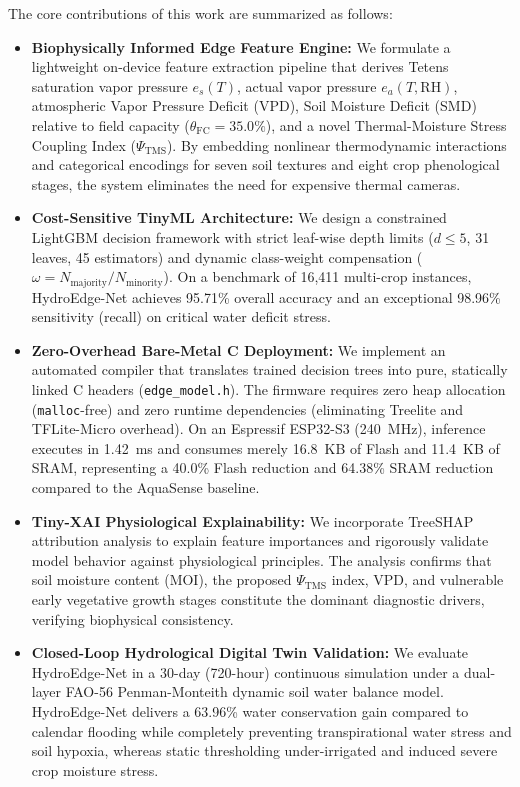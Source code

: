 The core contributions of this work are summarized as follows:
\begin{itemize}
    \item \textbf{Biophysically Informed Edge Feature Engine:} We formulate a lightweight on-device feature extraction pipeline that derives Tetens saturation vapor pressure $e_s(T)$, actual vapor pressure $e_a(T, \text{RH})$, atmospheric Vapor Pressure Deficit (VPD), Soil Moisture Deficit (SMD) relative to field capacity ($\theta_{\text{FC}} = 35.0\%$), and a novel Thermal-Moisture Stress Coupling Index ($\Psi_{\text{TMS}}$). By embedding nonlinear thermodynamic interactions and categorical encodings for seven soil textures and eight crop phenological stages, the system eliminates the need for expensive thermal cameras.
    \item \textbf{Cost-Sensitive TinyML Architecture:} We design a constrained LightGBM decision framework with strict leaf-wise depth limits ($d \le 5$, 31 leaves, 45 estimators) and dynamic class-weight compensation ($\omega = N_{\text{majority}} / N_{\text{minority}}$). On a benchmark of 16,411 multi-crop instances, HydroEdge-Net achieves 95.71\% overall accuracy and an exceptional 98.96\% sensitivity (recall) on critical water deficit stress.
    \item \textbf{Zero-Overhead Bare-Metal C Deployment:} We implement an automated compiler that translates trained decision trees into pure, statically linked C headers (\texttt{edge\_model.h}). The firmware requires zero heap allocation (\texttt{malloc}-free) and zero runtime dependencies (eliminating Treelite and TFLite-Micro overhead). On an Espressif ESP32-S3 (240~MHz), inference executes in 1.42~ms and consumes merely 16.8~KB of Flash and 11.4~KB of SRAM, representing a 40.0\% Flash reduction and 64.38\% SRAM reduction compared to the AquaSense baseline.
    \item \textbf{Tiny-XAI Physiological Explainability:} We incorporate TreeSHAP attribution analysis to explain feature importances and rigorously validate model behavior against physiological principles. The analysis confirms that soil moisture content (MOI), the proposed $\Psi_{\text{TMS}}$ index, VPD, and vulnerable early vegetative growth stages constitute the dominant diagnostic drivers, verifying biophysical consistency.
    \item \textbf{Closed-Loop Hydrological Digital Twin Validation:} We evaluate HydroEdge-Net in a 30-day (720-hour) continuous simulation under a dual-layer FAO-56 Penman-Monteith dynamic soil water balance model. HydroEdge-Net delivers a 63.96\% water conservation gain compared to calendar flooding while completely preventing transpirational water stress and soil hypoxia, whereas static thresholding under-irrigated and induced severe crop moisture stress.
\end{itemize}

